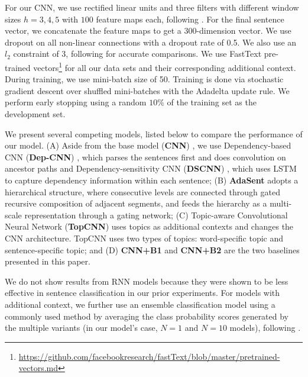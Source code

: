 \documentclass{article}
\begin{document}
For our CNN, we use rectified linear units and three filters with different window sizes $h=3,4,5$ with $100$ feature maps each, following \cite{Kim2014ConvolutionalNN}. For the final sentence vector, we concatenate the feature maps to get a 300-dimension vector. We use dropout \cite{srivastava2014dropout} on all non-linear connections with a dropout rate of 0.5. We also use an $l_2$ constraint of 3, following
\cite{Kim2014ConvolutionalNN} for accurate comparisons. We use FastText pre-trained vectors\footnote{\url{https://github.com/facebookresearch/fastText/blob/master/pretrained-vectors.md}} \cite{bojanowski2016enriching} for all our data sets and their corresponding additional context.
During training, we use mini-batch size of 50. Training is done via stochastic gradient descent over shuffled mini-batches with the Adadelta update rule. We perform early stopping using a random $10\%$ of the training set as the development set.

We present several competing models, listed below to compare the performance of our model. (A) Aside from the base model (\textbf{CNN}) \cite{Kim2014ConvolutionalNN}, we use Dependency-based CNN (\textbf{Dep-CNN}) \cite{ma2015dependency}, which parses the sentences first and does convolution on ancestor paths and Dependency-sensitivity CNN (\textbf{DSCNN}) \cite{zhang2016dependency}, which uses LSTM to capture dependency information within each sentence; (B) \textbf{AdaSent} \cite{zhao2015self} adopts a hierarchical structure, where consecutive levels are connected through gated recursive composition of adjacent segments, and feeds the hierarchy as a multi-scale representation through a gating network;
(C) Topic-aware Convolutional Neural Network (\textbf{TopCNN}) \cite{zhao2017topic} uses topics as additional contexts and changes the CNN architecture. TopCNN uses two types of topics: word-specific topic and sentence-specific topic; and
(D) \textbf{CNN+B1} and \textbf{CNN+B2} are the two baselines presented in this paper. 

We do not show results from RNN models because they were shown to be less effective in sentence classification in our prior experiments.
For models with additional context, we further use an ensemble classification model using a commonly used method by averaging the class probability scores generated by the multiple variants (in our model's case, $N=1$ and $N=10$ models), following \cite{zhao2017topic}.
\end{document}

